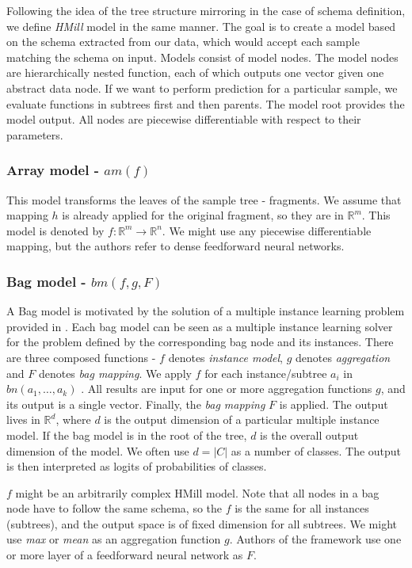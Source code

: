 Following the idea of the tree structure mirroring in the case of schema definition, we define \emph{HMill} model in the same manner. The goal is to create a model based on the schema extracted from our data, which would accept each sample matching the schema on input. Models consist of model nodes. The model nodes are hierarchically nested function, each of which outputs one vector given one abstract data node. If we want to perform prediction for a particular sample, we evaluate functions in subtrees first and then parents. The model root provides the model output. All nodes are piecewise differentiable with respect to their parameters.

\subsubsection{Array model - $am(f)$}
This model transforms the leaves of the sample tree - fragments. We assume that mapping $h$ is already applied for the original fragment, so they are in $\mathbb{R}^m$.  This model is denoted by $f:\mathbb{R}^m\rightarrow\mathbb{R}^n$. We might use any piecewise differentiable mapping, but the authors refer to dense feedforward neural networks.

\subsubsection{Bag model - $bm(f,g,F)$}
A Bag model is motivated by the solution of a multiple instance learning problem provided in \cite{Pevny2016a}. Each bag model can be seen as a multiple instance learning solver for the problem defined by the corresponding bag node and its instances. There are three composed functions - $f$ denotes \emph{instance model}, $g$ denotes \emph{aggregation} and $F$ denotes \emph{bag mapping}. We apply $f$ for each instance/subtree $a_i$ in $bn(a_1,\dots,a_k)$ . All results are input for one or more aggregation functions $g$, and its output is a single vector. Finally, the \emph{bag mapping} $F$ is applied. The output lives in  $\mathbb{R}^d$, where $d$ is the output dimension of a particular multiple instance model. If the bag model is in the root of the tree, $d$ is the overall output dimension of the model. We often use $d=|C|$ as a number of classes. The output is then interpreted as logits of probabilities of classes.

$f$ might be an arbitrarily complex HMill model. Note that all nodes in a bag node have to follow the same schema, so the $f$ is the same for all instances (subtrees), and the output space is of fixed dimension for all subtrees. We might use \emph{max} or \emph{mean} as an aggregation function $g$. Authors of the framework use one or more layer of a feedforward neural network as $F$.

